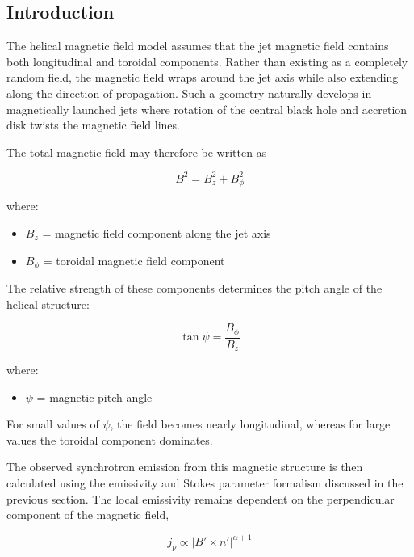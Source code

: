 \documentclass{article}
\begin{document}
\subsection{Introduction}

The helical magnetic field model assumes that the jet magnetic field contains both longitudinal and toroidal components. Rather than existing as a completely random field, the magnetic field wraps around the jet axis while also extending along the direction of propagation. Such a geometry naturally develops in magnetically launched jets where rotation of the central black hole and accretion disk twists the magnetic field lines.

The total magnetic field may therefore be written as

\begin{equation}
B^2 = B_z^2 + B_{\phi}^2
\end{equation}

where:

\begin{itemize}
\item $B_z$ = magnetic field component along the jet axis
\item $B_\phi$ = toroidal magnetic field component
\end{itemize}

The relative strength of these components determines the pitch angle of the helical structure:

\begin{equation}
\tan \psi
=
\frac{B_\phi}{B_z}
\end{equation}

where:

\begin{itemize}
\item $\psi$ = magnetic pitch angle
\end{itemize}

For small values of $\psi$, the field becomes nearly longitudinal, whereas for large values the toroidal component dominates.

The observed synchrotron emission from this magnetic structure is then calculated using the emissivity and Stokes parameter formalism discussed in the previous section. The local emissivity remains dependent on the perpendicular component of the magnetic field,

\begin{equation}
j_\nu
\propto
|B'\times n'|^{\alpha+1}
\end{equation}
\end{document}
